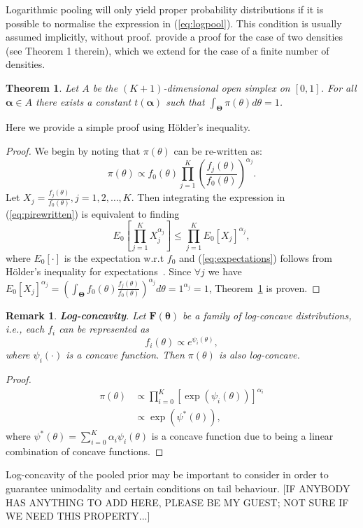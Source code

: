 \documentclass[a4paper, notitlepage, 11pt]{article}
\newtheorem{theo}{Theorem}[]
\newtheorem{remark}{Remark}[]
\begin{document}
Logarithmic pooling will only yield proper probability distributions if it is possible to normalise the expression in (\ref{eq:logpool}).
This condition is usually assumed implicitly, without proof.
\citet{poole2000} provide a proof for the case of two densities (see Theorem 1 therein), which we extend for the case of a finite number of densities.
\begin{theo}
\label{thm:normalisation}
Let $A$ be the $(K+1)$-dimensional open simplex on $[0,1]$.
For all $\boldsymbol\alpha \in A$ there exists a constant $t(\boldsymbol\alpha)$ such that $\int_{\boldsymbol\Theta}\pi(\theta)d\theta = 1$.
\end{theo}

Here we provide a simple proof using H\"{o}lder's inequality.
\begin{proof}
We begin by noting that $\pi(\theta)$ can be re-written as:
\begin{equation}
\label{eq:pirewritten}
 \pi(\theta) \propto f_0(\theta)\prod_{j=1}^{K} \left(\frac{f_j(\theta)}{f_0(\theta)}\right)^{\alpha_j}.
\end{equation}
Let $X_j = \frac{f_j(\theta)}{f_0(\theta)}, j=1, 2,\ldots, K$. 
Then integrating the expression in (\ref{eq:pirewritten}) is equivalent to finding 
\begin{equation}
\label{eq:expectations}
E_{0}\left[\prod_{j=1}^KX_j^{\alpha_j}\right] \leq \prod_{j=1}^KE_{0}[X_j]^{\alpha_j},
\end{equation}
where $E_{0}[\cdot]$ is the expectation w.r.t $f_0$ and (\ref{eq:expectations}) follows from H\"{o}lder's inequality for expectations~\citep{yeh2011}.
Since $\forall j$ we have $E_{0}[X_j]^{\alpha_j} = \left(\int_{\boldsymbol\Theta}f_0(\theta)\frac{f_j(\theta)}{f_0(\theta)}\right)^{\alpha_j}d\theta=1^{\alpha_j}=1$, Theorem~\ref{thm:normalisation} is proven.
\end{proof}

\begin{remark}
\textbf{Log-concavity}. 
 Let $\mathbf{F(\theta)}$ be a family of log-concave distributions, i.e., each $f_i$ can be represented as
 \begin{equation}
  \label{eq:logconcavity}
  f_i(\theta) \propto e^{\psi_i(\theta)},
 \end{equation}
where $\psi_i(\cdot)$ is a concave function.
Then $\pi(\theta)$ is also log-concave.
\end{remark}
\begin{proof}
\begin{align}
 \pi(\theta) &\propto \prod_{i=0}^{K} [\exp(\psi_i(\theta))]^{\alpha_i}\\
             &\propto \exp(\psi^{\ast}(\theta)),
\end{align}
 where $\psi^{\ast}(\theta) = \sum_{i=0}^{K}\alpha_i\psi_i(\theta)$ is a concave function due to being a linear combination of concave functions.
\end{proof}
Log-concavity of the pooled prior may be important to consider in order to guarantee unimodality and certain conditions on tail behaviour.
[IF ANYBODY HAS ANYTHING TO ADD HERE, PLEASE BE MY GUEST; NOT SURE IF WE NEED THIS PROPERTY...]
\end{document}
